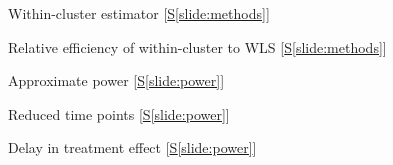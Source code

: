 \documentclass[9pt]{beamer}
\begin{document}



\begin{frame}{Within-cluster estimator [\hyperlink{slide:methods}{S\ref{slide:methods}}]} \label{apx:withincluster}
\end{frame}



\begin{frame}{Relative efficiency of within-cluster to WLS [\hyperlink{slide:methods}{S\ref{slide:methods}}]} \label{apx:efficiency}
\end{frame}



\begin{frame}{Approximate power [\hyperlink{slide:power}{S\ref{slide:power}}]} \label{apx:power}
\end{frame}



\begin{frame}{Reduced time points [\hyperlink{slide:power}{S\ref{slide:power}}]} \label{apx:timepoints}
\end{frame}



\begin{frame}{Delay in treatment effect [\hyperlink{slide:power}{S\ref{slide:power}}]} \label{apx:delay}
\end{frame}
\end{document}
